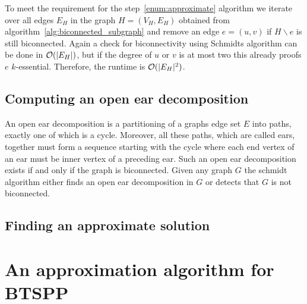 To meet the requirement for the step~\ref{enum:approximate} algorithm we iterate over all edges \(E_H\) in the graph \(H = (V_H, E_H)\) obtained from algorithm~\ref{alg:biconnected_subgraph} and remove an edge \(e = (u, v)\) if \(H \backslash e\) is still biconnected. Again a check for biconnectivity using Schmidts algorithm can be done in \(\mathcal{O}(\vert E_H \vert)\), but if the degree of \(u\) or \(v\) is at most two this already proofs \(e\) \(k\)-essential. Therefore, the runtime is \(\mathcal{O}(\vert {E_H} \vert^2)\).

\subsection{Computing an open ear decomposition}\label{subsec:open_ear_decomposition}

An open ear decomposition is a partitioning of a graphs edge set \(E\) into paths, exactly one of which is a cycle. Moreover, all these paths, which are called ears, together must form a sequence starting with the cycle where each end vertex of an ear must be inner vertex of a preceding ear.
Such an open ear decomposition exists if and only if the graph is biconnected.
Given any graph \(G\) the schmidt algorithm either finds an open ear decomposition in \(G\) or detects that \(G\) is not biconnected.

\subsection{Finding an approximate solution}

\section{An approximation algorithm for BTSPP}